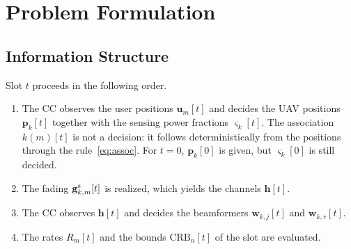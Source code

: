 \documentclass[conference]{IEEEtran}
\begin{document}

\section{Problem Formulation}\label{sec:problem}

\subsection{Information Structure}\label{sec:info}

Slot $t$ proceeds in the following order.
\begin{enumerate}
\item The CC observes the user positions $\mathbf u_m[t]$ and decides the UAV positions $\mathbf p_k[t]$ together with the sensing power fractions $\varsigma_k[t]$. The association $k(m)[t]$ is not a decision: it follows deterministically from the positions through the rule~\eqref{eq:assoc}. For $t=0$, $\mathbf p_k[0]$ is given, but $\varsigma_k[0]$ is still decided.
\item The fading $\mathbf g^{\rm s}_{k,m}[t]$ is realized, which yields the channels $\mathbf h[t]$.
\item The CC observes $\mathbf h[t]$ and decides the beamformers $\mathbf w_{k,j}[t]$ and $\mathbf w_{k,r}[t]$.
\item The rates $R_m[t]$ and the bounds $\mathrm{CRB}_n[t]$ of the slot are evaluated.
\end{enumerate}
\end{document}
